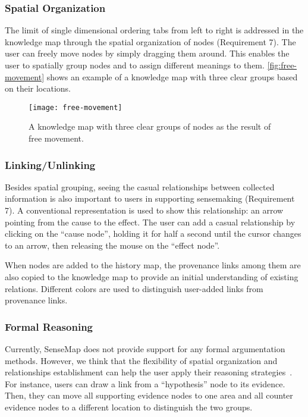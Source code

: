 \subsubsection{Spatial Organization}
The limit of single dimensional ordering tabs from left to right is addressed in the knowledge map through the spatial organization of nodes (Requirement 7). The user can freely move nodes by simply dragging them around. This enables the user to spatially group nodes and to assign different meanings to them. \autoref{fig:free-movement} shows an example of a knowledge map with three clear groups based on their locations.

\begin{figure}[!htb]
	\centering
	\texttt{[image: free-movement]}
	\caption{A knowledge map with three clear groups of nodes as the result of free movement.}
	\label{fig:free-movement}
\end{figure}

\subsubsection{Linking/Unlinking}
Besides spatial grouping, seeing the casual relationships between collected information is also important to users in supporting sensemaking (Requirement 7). A conventional representation is used to show this relationship: an arrow pointing from the cause to the effect. The user can add a casual relationship by clicking on the ``cause node'', holding it for half a second until the cursor changes to an arrow, then  releasing the mouse on the ``effect node''.

When nodes are added to the history map, the provenance links among them are also copied to the knowledge map to provide an initial understanding of existing relations. Different colors are used to distinguish user-added links from provenance links.

\subsubsection{Formal Reasoning}
Currently, SenseMap does not provide support for any formal argumentation methods. However, we think that the flexibility of spatial organization and relationships establishment can help the user apply their reasoning strategies~\cite{Sedig2013}. For instance, users can draw a link from a ``hypothesis'' node to its evidence. Then, they can move all supporting evidence nodes to one area and all counter evidence nodes to a different location to distinguish the two groups.

